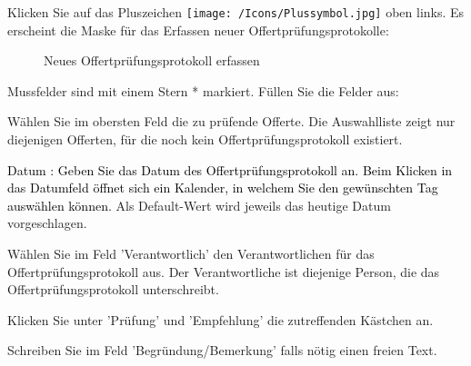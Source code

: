 Klicken Sie auf das Pluszeichen \texttt{[image: /Icons/Plussymbol.jpg]}  oben links. Es erscheint die Maske für das Erfassen neuer Offertprüfungsprotokolle:

\begin{figure}[H]
\caption{Neues Offertprüfungsprotokoll erfassen}
\end{figure}

Mussfelder sind mit einem Stern * markiert. Füllen Sie die Felder aus:

\vspace{\baselineskip}

\begin{compactitem}
\item
Wählen Sie im obersten Feld die zu prüfende Offerte. Die Auswahlliste  zeigt nur diejenigen Offerten, für die noch kein Offertprüfungsprotokoll existiert.
\item
\textcolor{black}{Datum } \textcolor{black}{: Geben Sie das Datum des Offertprüfungsprotokoll an. Beim Klicken in das Datumfeld öffnet sich ein Kalender, in welchem Sie den gewünschten Tag auswählen können. }Als Default-Wert wird jeweils das heutige Datum vorgeschlagen.
\item
Wählen Sie im Feld 'Verantwortlich'  den Verantwortlichen für das Offertprüfungsprotokoll aus. Der Verantwortliche ist diejenige Person, die das Offertprüfungsprotokoll unterschreibt.
\item {\sffamily
Klicken Sie unter 'Prüfung'  und 'Empfehlung'  die zutreffenden Kästchen an.}
\item
Schreiben Sie im Feld 'Begründung/Bemerkung'  falls nötig einen freien Text.
\end{compactitem}

